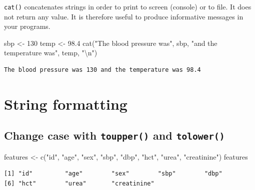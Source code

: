 \documentclass[
]{book}
\newenvironment{Shaded}{\begin{snugshade}}{\end{snugshade}}
\newcommand{\DecValTok}[1]{\textcolor[rgb]{0.00,0.00,0.81}{#1}}
\newcommand{\FloatTok}[1]{\textcolor[rgb]{0.00,0.00,0.81}{#1}}
\newcommand{\FunctionTok}[1]{\textcolor[rgb]{0.00,0.00,0.00}{#1}}
\newcommand{\NormalTok}[1]{#1}
\newcommand{\OtherTok}[1]{\textcolor[rgb]{0.56,0.35,0.01}{#1}}
\newcommand{\SpecialCharTok}[1]{\textcolor[rgb]{0.00,0.00,0.00}{#1}}
\newcommand{\StringTok}[1]{\textcolor[rgb]{0.31,0.60,0.02}{#1}}
\begin{document}
\texttt{cat()} concatenates strings in order to print to screen (console) or to file. It does not return any value. It is therefore useful to produce informative messages in your programs.

\begin{Shaded}
\begin{Highlighting}[]
\NormalTok{sbp }\OtherTok{\textless{}{-}} \DecValTok{130}
\NormalTok{temp }\OtherTok{\textless{}{-}} \FloatTok{98.4}
\FunctionTok{cat}\NormalTok{(}\StringTok{"The blood pressure was"}\NormalTok{, sbp, }\StringTok{"and the temperature was"}\NormalTok{, temp, }\StringTok{"}\SpecialCharTok{\textbackslash{}n}\StringTok{"}\NormalTok{)}
\end{Highlighting}
\end{Shaded}

\begin{verbatim}
The blood pressure was 130 and the temperature was 98.4 
\end{verbatim}

\hypertarget{string-formatting}{%
\section{String formatting}\label{string-formatting}}

\hypertarget{change-case-with-toupper-and-tolower}{%
\subsection{\texorpdfstring{Change case with \texttt{toupper()} and \texttt{tolower()}}{Change case with toupper() and tolower()}}\label{change-case-with-toupper-and-tolower}}

\begin{Shaded}
\begin{Highlighting}[]
\NormalTok{features }\OtherTok{\textless{}{-}} \FunctionTok{c}\NormalTok{(}\StringTok{"id"}\NormalTok{, }\StringTok{"age"}\NormalTok{, }\StringTok{"sex"}\NormalTok{, }\StringTok{"sbp"}\NormalTok{, }\StringTok{"dbp"}\NormalTok{, }\StringTok{"hct"}\NormalTok{, }\StringTok{"urea"}\NormalTok{, }\StringTok{"creatinine"}\NormalTok{)}
\NormalTok{features}
\end{Highlighting}
\end{Shaded}

\begin{verbatim}
[1] "id"         "age"        "sex"        "sbp"        "dbp"       
[6] "hct"        "urea"       "creatinine"
\end{verbatim}
\end{document}

